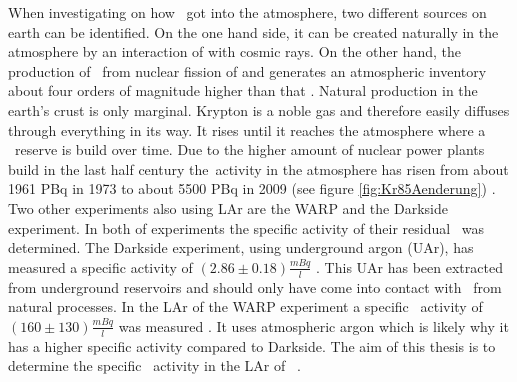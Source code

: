 \documentclass[encoding=utf8,british]{tumphthesis}
\begin{document}
When investigating on how  \Kr\ got into the atmosphere, two different sources on earth can be identified.
On the one hand side, it can be created naturally in the atmosphere by an interaction of  with cosmic rays.
On the other hand, the production of \Kr\ from nuclear fission of  and  generates an atmospheric inventory about four orders of magnitude higher than that \cite{winger_new_2005}.
Natural production in the earth's crust is only marginal.
Krypton is a noble gas and therefore easily diffuses through everything in its way.
It rises until it reaches the atmosphere where a \Kr\ reserve is build over time.  
Due to the higher amount of nuclear power plants build in the last half century the\Kr\ activity in the atmosphere has risen from about 1961 PBq in 1973 \cite{telegadas_atmospheric_1975} to about 5500 PBq in 2009 (see figure \ref{fig:Kr85Aenderung}) \cite{ahlswede_update_2013}.
\\

Two other experiments also using LAr are the WARP and the Darkside experiment.
In both of experiments the specific activity of their residual \Kr\ was determined.
The Darkside experiment, using underground argon (UAr), has measured a specific activity of \((2.86\pm0.18) \frac{\unit{mBq}} {\unit{l}}\)  \cite{agnes_results_2016}.
This UAr has been extracted from underground reservoirs and should only have come into contact with \Kr\ from natural processes.
In the LAr of the WARP experiment a specific \Kr\ activity of   \((160\pm130)\frac{\unit{mBq}}{\unit{l}}\) was measured \cite{benetti_measurement_2006}.
It uses atmospheric argon which is likely why it has a higher specific activity compared to Darkside.
The aim of this thesis is to determine the specific \Kr\ activity in the LAr of \gerda\ \PII.

\end{document}
